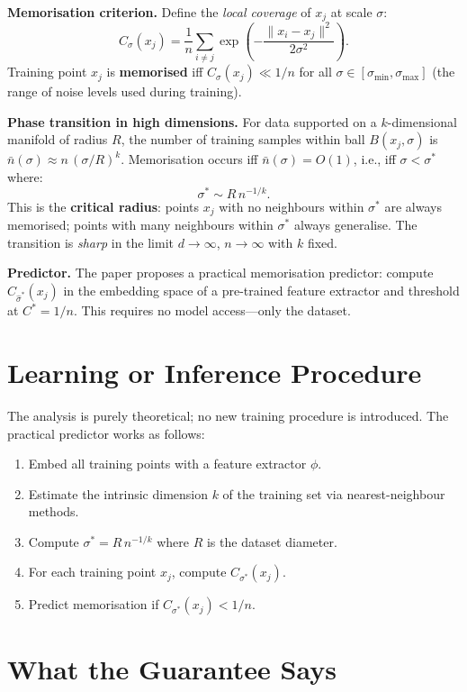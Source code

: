 \documentclass[10pt,twocolumn]{article}
\begin{document}
\textbf{Memorisation criterion.}
Define the \emph{local coverage} of $x_j$ at scale $\sigma$:
\[
C_\sigma(x_j) = \frac{1}{n}\sum_{i\neq j}
  \exp\!\left(-\frac{\|x_i - x_j\|^2}{2\sigma^2}\right).
\]
Training point $x_j$ is \textbf{memorised} iff
$C_\sigma(x_j) \ll 1/n$ for all $\sigma \in [\sigma_\min, \sigma_\max]$
(the range of noise levels used during training).

\textbf{Phase transition in high dimensions.}
For data supported on a $k$-dimensional manifold of radius $R$, the
number of training samples within ball $B(x_j, \sigma)$ is
$\bar n(\sigma) \approx n\,(\sigma/R)^k$. Memorisation occurs iff
$\bar n(\sigma) = O(1)$, i.e., iff $\sigma < \sigma^*$ where:
\[
\sigma^* \sim R\,n^{-1/k}.
\]
This is the \textbf{critical radius}: points $x_j$ with no neighbours
within $\sigma^*$ are always memorised; points with many neighbours
within $\sigma^*$ always generalise. The transition is \emph{sharp} in
the limit $d \to\infty$, $n\to\infty$ with $k$ fixed.

\textbf{Predictor.}
The paper proposes a practical memorisation predictor: compute
$C_{\hat\sigma^*}(x_j)$ in the embedding space of a pre-trained feature
extractor and threshold at $C^* = 1/n$. This requires no model
access---only the dataset.

\section{Learning or Inference Procedure}

The analysis is purely theoretical; no new training procedure is introduced.
The practical predictor works as follows:
\begin{enumerate}[itemsep=2pt,parsep=0pt]
  \item Embed all training points with a feature extractor $\phi$.
  \item Estimate the intrinsic dimension $k$ of the training set via
    nearest-neighbour methods.
  \item Compute $\sigma^* = R\,n^{-1/k}$ where $R$ is the dataset diameter.
  \item For each training point $x_j$, compute $C_{\sigma^*}(x_j)$.
  \item Predict memorisation if $C_{\sigma^*}(x_j) < 1/n$.
\end{enumerate}

\section{What the Guarantee Says}
\end{document}
